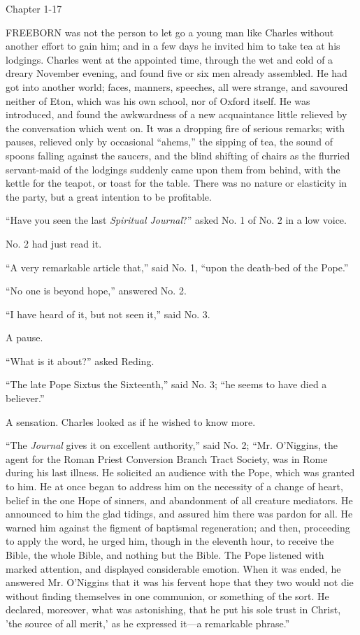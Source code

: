 Chapter 1-17


FREEBORN was not the person to let go a
young man like Charles without another effort to gain him; and in a
few days he invited him to take tea at his lodgings. Charles went at
the appointed time, through the wet and cold of a dreary November
evening, and found five or six men already assembled. He had got into
another world; faces, manners, speeches, all were strange, and
savoured neither of Eton, which was his own school, nor of Oxford
itself. He was introduced, and found the awkwardness of a new
acquaintance little relieved by the conversation which went on. It was
a dropping fire of serious remarks; with pauses, relieved only by
occasional ``ahems,'' the sipping of tea, the sound of spoons
falling against the saucers, and the blind shifting of chairs as the
flurried servant-maid of the lodgings suddenly came upon them from
behind, with the kettle for the teapot, or toast for the table. There
was no nature or elasticity in the party, but a great intention to be
profitable.

``Have you seen the last \emph{Spiritual Journal}?'' asked
No. 1 of No. 2 in a low voice.

No. 2 had just read it.

``A very remarkable article that,'' said No. 1, ``upon
the death-bed of the Pope.''

``No one is beyond hope,'' answered No. 2.

``I have heard of it, but not seen it,'' said No. 3.

A pause.

``What is it about?'' asked Reding.

``The late Pope Sixtus the Sixteenth,'' said No. 3;
``he seems to have died a believer.''

A sensation. Charles looked as if he wished to know more.

``The \emph{Journal} gives it on excellent authority,''
said No. 2; ``Mr. O'Niggins, the agent for the Roman Priest
Conversion Branch Tract Society, was in Rome during his last illness.
He solicited an audience with the Pope, which was granted to him. He
at once began to address him on the necessity of a change of heart,
belief in the one Hope of sinners, and abandonment of all creature
mediators. He announced to him the glad tidings, and assured him there
was pardon for all. He warned him against the figment of baptismal
regeneration; and then, proceeding to apply the word, he urged him,
though in the eleventh hour, to receive the Bible, the whole Bible,
and nothing but the Bible. The Pope listened with marked attention,
and displayed considerable emotion. When it was ended, he answered Mr.
O'Niggins that it was his fervent hope that they two would not die
without finding themselves in one communion, or something of the sort.
He declared, moreover, what was astonishing, that he put his sole
trust in Christ, 'the source of all merit,' as he expressed it—a
remarkable phrase.''

